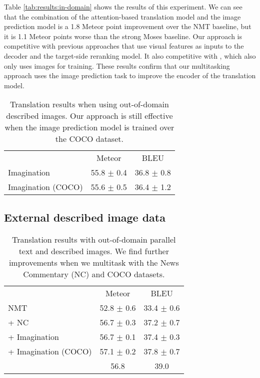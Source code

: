 Table \ref{tab:results:in-domain} shows the results of this experiment.
We can see that the combination of the attention-based translation model and the image
prediction model is a 1.8 Meteor point improvement over the NMT
baseline, but it is 1.1 Meteor points worse than the strong Moses baseline. Our approach is competitive with previous approaches that use visual features as inputs to the decoder and the target-side reranking model. It also competitive with \citep{toyama2016neural}, which also only uses images for training.  These results confirm that our multitasking approach uses the image prediction task to improve the encoder of the translation model.

\begin{table}[t]
\centering
\renewcommand{\arraystretch}{1.3}
\begin{tabular}{lcc}
\cmidrule[0.08em](l{5pt}r{5pt}){1-3}
& Meteor & BLEU \\
\cmidrule(l{5pt}r{5pt}){1-3}
Imagination & 55.8 $\pm$ 0.4 & 36.8 $\pm$ 0.8 \\
Imagination (COCO) & 55.6 $\pm$ 0.5 & 36.4 $\pm$ 1.2 \\
\cmidrule[0.08em](l{5pt}r{5pt}){1-3}
\end{tabular}
\caption{Translation results when using out-of-domain described images. Our approach is still effective when the image prediction model is trained over the COCO dataset.}\label{tab:results:ood-coco}
\end{table}

\subsection{External described image data}\label{sec:experiments:ood-images}


\begin{table}
\centering
\renewcommand{\arraystretch}{1.3}
\begin{tabular}{@{}lcc}
\cmidrule[0.08em](l{1pt}r{5pt}){1-3}
 & Meteor & BLEU \\
\cmidrule(l{1pt}r{5pt}){1-3}
NMT & 52.8 $\pm$ 0.6 & 33.4 $\pm$ 0.6\\
+ NC & 56.7 $\pm$ 0.3 & 37.2 $\pm$ 0.7 \\
+ Imagination & 56.7 $\pm$ 0.1 & 37.4 $\pm$ 0.3 \\
+ Imagination (COCO) & 57.1 $\pm$ 0.2 & 37.8 $\pm$ 0.7 \\
\citep{Calixto2017c} & 56.8 & 39.0 \\
\cmidrule[0.08em](l{1pt}r{5pt}){1-3}
\end{tabular}
	\caption{Translation results with out-of-domain parallel text and described images. We find further improvements when we multitask with the News Commentary (NC) and COCO datasets.}\label{tab:results:ood-both}
\end{table}

